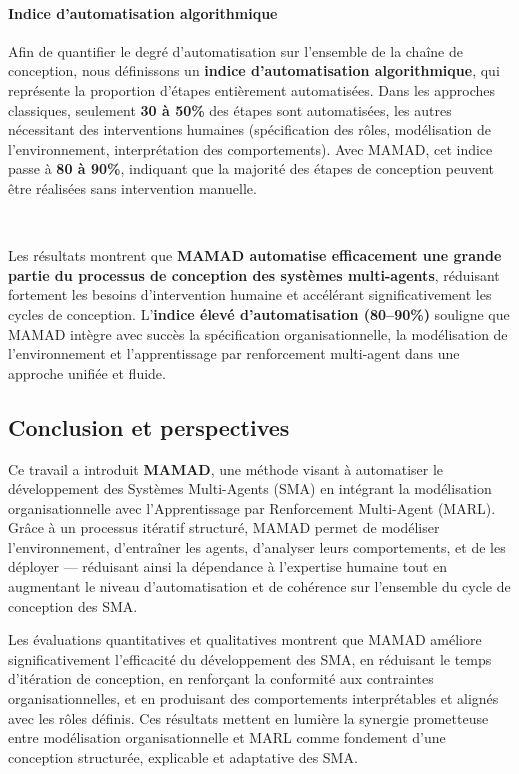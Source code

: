 \paragraph{Indice d'automatisation algorithmique}

Afin de quantifier le degré d'automatisation sur l'ensemble de la chaîne de conception, nous définissons un \textbf{indice d'automatisation algorithmique}, qui représente la proportion d'étapes entièrement automatisées. Dans les approches classiques, seulement \textbf{30 à 50\%} des étapes sont automatisées, les autres nécessitant des interventions humaines (spécification des rôles, modélisation de l'environnement, interprétation des comportements). Avec MAMAD, cet indice passe à \textbf{80 à 90\%}, indiquant que la majorité des étapes de conception peuvent être réalisées sans intervention manuelle.

\

Les résultats montrent que \textbf{MAMAD automatise efficacement une grande partie du processus de conception des systèmes multi-agents}, réduisant fortement les besoins d'intervention humaine et accélérant significativement les cycles de conception. L'\textbf{indice élevé d'automatisation (80--90\%)} souligne que MAMAD intègre avec succès la spécification organisationnelle, la modélisation de l'environnement et l'apprentissage par renforcement multi-agent dans une approche unifiée et fluide.


\subsection{Conclusion et perspectives} \label{sec:conclusion}

Ce travail a introduit \textbf{MAMAD}, une méthode visant à automatiser le développement des Systèmes Multi-Agents (SMA) en intégrant la modélisation organisationnelle avec l'Apprentissage par Renforcement Multi-Agent (MARL). Grâce à un processus itératif structuré, MAMAD permet de modéliser l'environnement, d'entraîner les agents, d'analyser leurs comportements, et de les déployer — réduisant ainsi la dépendance à l'expertise humaine tout en augmentant le niveau d'automatisation et de cohérence sur l'ensemble du cycle de conception des SMA.

Les évaluations quantitatives et qualitatives montrent que MAMAD améliore significativement l'efficacité du développement des SMA, en réduisant le temps d'itération de conception, en renforçant la conformité aux contraintes organisationnelles, et en produisant des comportements interprétables et alignés avec les rôles définis. Ces résultats mettent en lumière la synergie prometteuse entre modélisation organisationnelle et MARL comme fondement d'une conception structurée, explicable et adaptative des SMA.

